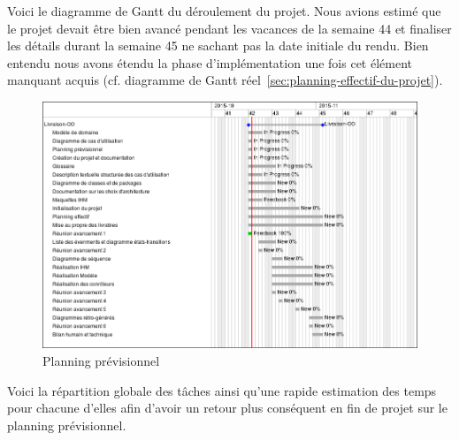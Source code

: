\documentclass[paper=a4, fontsize=11pt]{report}
\numberwithin{equation}{section}		%
\numberwithin{figure}{section}		%
\numberwithin{table}{section}		%
\begin{document}
Voici le diagramme de Gantt du déroulement du projet.
Nous avions estimé que le projet devait être bien avancé pendant les vacances de la semaine 44 et finaliser les détails durant la semaine 45 ne sachant pas la date initiale du rendu. Bien entendu nous avons étendu la phase d'implémentation une fois cet élément manquant acquis (cf. diagramme de Gantt réel~\ref{sec:planning-effectif-du-projet}).

\begin{figure}[H]
\centering
\includegraphics[scale=0.5,angle=0]{redmine/gantt-prev.png}
\caption{Planning prévisionnel}
\end{figure}

Voici la répartition globale des tâches ainsi qu'une rapide estimation des temps pour chacune d'elles afin d'avoir un retour plus conséquent en fin de projet sur le planning prévisionnel.
\end{document}
